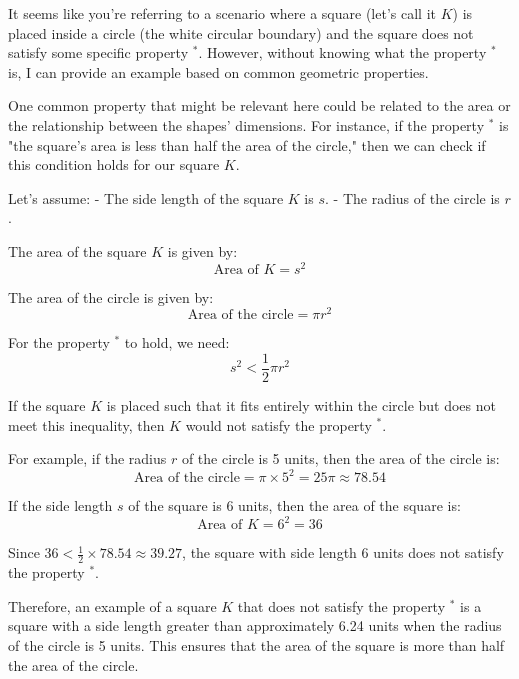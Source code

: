 It seems like you're referring to a scenario where a square (let's call it \( K \)) is placed inside a circle (the white circular boundary) and the square does not satisfy some specific property \({}^*\). However, without knowing what the property \({}^*\) is, I can provide an example based on common geometric properties.

One common property that might be relevant here could be related to the area or the relationship between the shapes' dimensions. For instance, if the property \({}^*\) is "the square's area is less than half the area of the circle," then we can check if this condition holds for our square \( K \).

Let's assume:
- The side length of the square \( K \) is \( s \).
- The radius of the circle is \( r \).

The area of the square \( K \) is given by:
\[ \text{Area of } K = s^2 \]

The area of the circle is given by:
\[ \text{Area of the circle} = \pi r^2 \]

For the property \({}^*\) to hold, we need:
\[ s^2 < \frac{1}{2} \pi r^2 \]

If the square \( K \) is placed such that it fits entirely within the circle but does not meet this inequality, then \( K \) would not satisfy the property \({}^*\).

For example, if the radius \( r \) of the circle is 5 units, then the area of the circle is:
\[ \text{Area of the circle} = \pi \times 5^2 = 25\pi \approx 78.54 \]

If the side length \( s \) of the square is 6 units, then the area of the square is:
\[ \text{Area of } K = 6^2 = 36 \]

Since \( 36 < \frac{1}{2} \times 78.54 \approx 39.27 \), the square with side length 6 units does not satisfy the property \({}^*\).

Therefore, an example of a square \( K \) that does not satisfy the property \({}^*\) is a square with a side length greater than approximately 6.24 units when the radius of the circle is 5 units. This ensures that the area of the square is more than half the area of the circle.